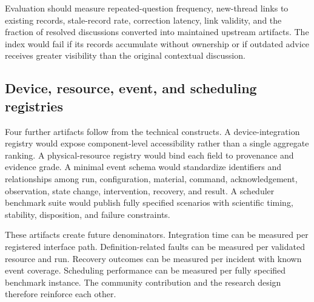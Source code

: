 Evaluation should measure repeated-question frequency, new-thread links to existing records, stale-record rate, correction latency, link validity, and the fraction of resolved discussions converted into maintained upstream artifacts. The index would fail if its records accumulate without ownership or if outdated advice receives greater visibility than the original contextual discussion.

\subsection{Device, resource, event, and scheduling registries}

Four further artifacts follow from the technical constructs. A device-integration registry would expose component-level accessibility rather than a single aggregate ranking. A physical-resource registry would bind each field to provenance and evidence grade. A minimal event schema would standardize identifiers and relationships among run, configuration, material, command, acknowledgement, observation, state change, intervention, recovery, and result. A scheduler benchmark suite would publish fully specified scenarios with scientific timing, stability, disposition, and failure constraints.

These artifacts create future denominators. Integration time can be measured per registered interface path. Definition-related faults can be measured per validated resource and run. Recovery outcomes can be measured per incident with known event coverage. Scheduling performance can be measured per fully specified benchmark instance. The community contribution and the research design therefore reinforce each other.

